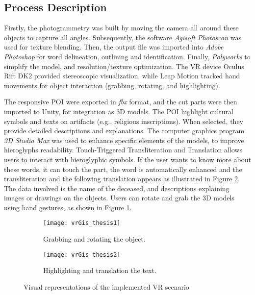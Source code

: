 
\subsection*{Process Description}

Firstly, the photogrammetry was built by moving the camera all around these objects to capture all angles. Subsequently, the software \textit{Agisoft Photoscan} was used for texture blending. Then, the output file was imported into \textit{Adobe Photoshop} for word delineation, outlining and identification. 
Finally, \textit{Polyworks} to simplify the model, and resolution/texture optimization.
The \gls{VR} device Oculus Rift DK2 provided stereoscopic visualization, while Leap Motion tracked hand movements for object interaction (grabbing, rotating, and highlighting).

The responsive \gls{POI} were exported in \textit{fbx} format, and the cut parts were then imported to Unity, for integration as \gls{3D} models.
The \gls{POI} highlight cultural symbols and texts on artifacts (e.g., religious inscriptions). When selected, they provide detailed descriptions and explanations.
The computer graphics program \textit{\gls{3D} Studio Max} was used to enhance specific elements of the models, to improve hieroglyphs readability.
Touch-Triggered Transliteration and Translation allows users to interact with hieroglyphic symbols. If the user wants to know more about these words, it can touch the part, the word is automatically enhanced and the transliteration and the following translation appears as illustrated in Figure \ref{fig:vrGis_thesis2}. The data involved is the name of the deceased, and descriptions explaining images or drawings on the objects.
Users can rotate and grab the \gls{3D} models using hand gestures, as shown in Figure \ref{fig:vrGis_thesis1}.


\begin{figure}
  \centering
  \begin{subfigure}[b]{0.45\textwidth}
      \centering
      \texttt{[image: vrGis\_thesis1]}
      \caption{Grabbing and rotating the object.}
      \label{fig:vrGis_thesis1}
  \end{subfigure}
  \hfill
  \begin{subfigure}[b]{0.45\textwidth}
      \centering
      \texttt{[image: vrGis\_thesis2]}
      \caption{Highlighting and translation the text.}
      \label{fig:vrGis_thesis2}
  \end{subfigure}
     \caption{Visual representations of the implemented \gls{VR} scenario}
     \label{fig:vrGis_thesis}
\end{figure}


